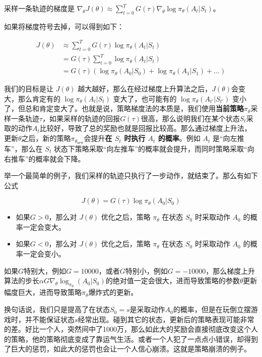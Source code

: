 \documentclass[lang=cn,newtx,10pt,scheme=chinese]{elegantbook}
\begin{document}
采样一条轨迹的梯度是 $\nabla_{\theta}J(\theta) \approx \sum_{t=0}^TG(\tau)\nabla_{\theta}\log\pi_{\theta}(A_t|S_t)$。

如果将梯度符号去掉，可以得到如下：

\begin{equation}
\begin{aligned}
J(\theta) & \approx \sum_{t=0}^TG(\tau)\log\pi_{\theta}(A_t|S_t) \\
& = G(\tau)\sum_{t=0}^T\log\pi_{\theta}(A_t|S_t) \\
& = G(\tau)\left( \log\pi_\theta(A_0|S_0) + \log\pi_\theta(A_1|S_1) + \dots\right)
\end{aligned}
\end{equation}

我们的目标是让 $J(\theta)$ 越大越好，那么在经过梯度上升算法之后，$J(\theta)$会变大，那么肯定有的 $\log\pi_\theta(A_t|S_t)$ 变大了，也可能有的 $\log\pi_\theta(A_{t'}|S_{t'})$ 变小了，但总和肯定变大了。也就是说，策略梯度法的本质是，我们使用\textbf{当前策略}$\pi_\theta$采样一条轨迹$\tau$，如果采样的轨迹的回报$G(\tau)$很高，那么说明我们在某个状态$S_t$采取的动作$A_t$比较好，导致了总的奖励也就是回报比较高。那么通过梯度上升法，更新$\theta$之后，新的策略$\pi_{\theta_\text{new}}$会提升\textbf{在 $S_t$ 时执行 $A_t$ 的概率}。例如 $A_t$ 是``向左推车''，那么在 $S_t$ 状态下策略采取``向左推车''的概率就会提升，而同时策略采取``向右推车''的概率就会下降。

举一个最简单的例子，我们采样的轨迹只执行了一步动作，就结束了。那么有如下公式

\begin{equation}
J(\theta) = G(\tau)\log\pi_\theta(A_0|S_0)
\end{equation}

\begin{itemize}
\item 如果$G>0$，那么对 $J(\theta)$ 优化之后，策略 $\pi_\theta$ 在状态 $S_0$ 时采取动作 $A_0$ 的概率一定会变大。
\item 如果$G<0$，那么对 $J(\theta)$ 优化之后，策略 $\pi_\theta$ 在状态 $S_0$ 时采取动作 $A_0$ 的概率一定会变小。
\end{itemize}

如果$G$特别大，例如$G=10000$，或者$G$特别小，例如$G=-10000$，那么梯度上升算法的步长$\alpha G\nabla_\theta\log_{\pi_{\theta}}(A_0|S_0)$的绝对值一定会很大，进而导致策略的参数$\theta$更新幅度巨大，进而导致策略$\pi_\theta$爆炸式的更新。

换句话说，我们只是提高了在状态$S_0=s$是采取动作$A_0$的概率，但是在玩倒立摆游戏时，并不能保证状态$s$经常出现。碰到其它的状态，更新后的策略表现可能非常的差。好比一个人，突然间中了1000万，那么如此大的奖励会直接彻底改变这个人的策略，他的策略彻底变成了靠运气生活。或者一个人犯了一点点小错误，却得到了巨大的惩罚，如此大的惩罚也会让一个人信心崩溃。这就是策略崩溃的例子。
\end{document}
